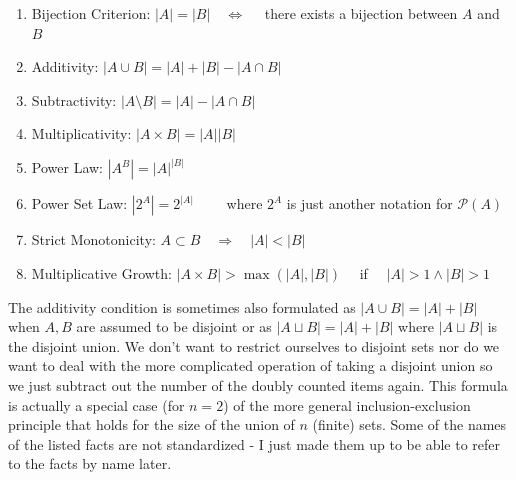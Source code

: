 \documentclass[12pt]{article}
\begin{document}
\begin{enumerate}
  \item Bijection Criterion: $|A| = |B| \quad  \Leftrightarrow  \quad$ there exists a bijection between $A$ and $B$
  \item Additivity: $|A \cup B| = |A| + |B| - |A \cap B|$ 
  \item Subtractivity:  $|A \setminus B| = |A| - |A \cap B|$ 
  \item Multiplicativity:  $|A \times B| = |A| |B|$ 
  \item Power Law: $|A^B| = |A|^{|B|}$
  \item Power Set Law: $|2^A| = 2^{|A|} \qquad$  where $2^A$ is just another notation for $\mathcal{P}(A)$
  \item Strict Monotonicity: $A \subset B \quad \Rightarrow \quad |A| < |B|$
  \item Multiplicative Growth: $|A \times B| > \max(|A|,|B|) \quad$ if $\quad |A| > 1 \wedge |B| > 1$
\end{enumerate}
The additivity condition is sometimes also formulated as $|A \cup B| = |A| + |B|$ when $A,B$ are assumed to be disjoint or as $|A \sqcup B| = |A| + |B|$ where $|A \sqcup B|$ is the disjoint union. We don't want to restrict ourselves to disjoint sets nor do we want to deal with the more complicated operation of taking a disjoint union so we just subtract out the number of the doubly counted items again. This formula is actually a special case (for $n=2$) of the more general inclusion-exclusion principle that holds for the size of the union of $n$ (finite) sets. Some of the names of the listed facts are not standardized - I just made them up to be able to refer to the facts by name later.
\end{document}
